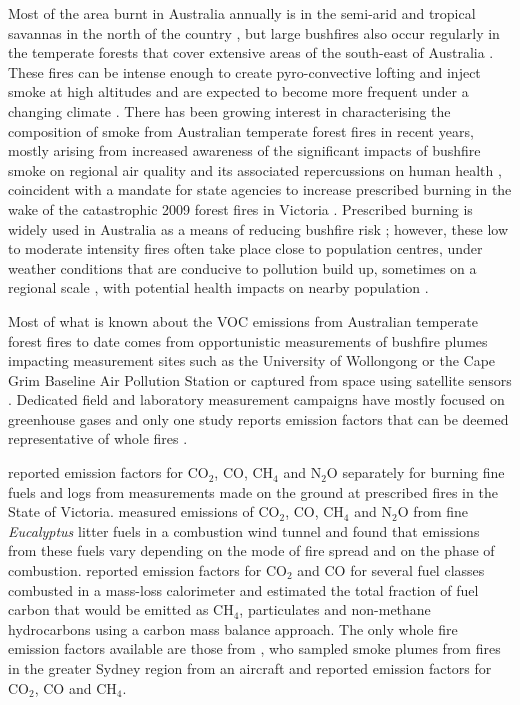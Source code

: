 \documentclass[acp, manuscript]{copernicus}
\begin{document}
Most of the area burnt in Australia annually is in the semi-arid and tropical savannas in the north of the country \citep{Russell-Smith2007}, but large bushfires also occur regularly in the temperate forests that cover extensive areas of the south-east of Australia \citep{Cai2009}. These fires can be intense enough to create pyro-convective lofting and inject smoke at high altitudes \citep{Fromm2006,Dirksen2009,Guan2010} and are expected to become more frequent under a changing climate \citep{Bradstock2009,Cai2009,Keywood2013,King2013}. There has been growing interest in characterising the composition of smoke from Australian temperate forest fires in recent years, mostly arising from increased awareness of the significant impacts of bushfire smoke on regional air quality \citep{Reisen2011,Reisen2013,Price2012,Keywood2015,Rea2016} and its associated repercussions on human health \citep{Reisen2006,Johnston2012,Johnston2014, Reisen2015, Reid2016}, coincident with a mandate for state agencies to increase prescribed burning in the wake of the catastrophic 2009 forest fires in Victoria \citep{Teague2010}. Prescribed burning is widely used in Australia as a means of reducing bushfire risk \citep{Boer2009}; however, these low to moderate intensity fires often take place close to population centres, under weather conditions that are conducive to pollution build up, sometimes on a regional scale \citep[e.g.,][Fig. 2]{Williamson2016}, with potential health impacts on nearby population \citep{Haikerwal2015}.

Most of what is known about the VOC emissions from Australian temperate forest fires to date comes from opportunistic measurements of bushfire plumes impacting measurement sites such as the University of Wollongong \citep{Paton-Walsh2005,Paton-Walsh2008, Rea2016} or the Cape Grim Baseline Air Pollution Station \citep{Lawson2015} or captured from space using satellite sensors \citep{Young2011,Glatthor2013}. Dedicated field and laboratory measurement campaigns have mostly focused on greenhouse gases \citep{Hurst1996,Volkova2014, Possell2015, Surawski2015} and only one study reports emission factors that can be deemed representative of whole fires \citep{Hurst1996}.    

\citet{Volkova2014} reported emission factors for CO$_2$, CO, CH$_4$ and N$_2$O separately for burning fine fuels and logs from measurements made on the ground at prescribed fires in the State of Victoria. \citet{Surawski2015} measured emissions of CO$_2$, CO, CH$_4$ and N$_2$O from fine \textit{Eucalyptus}
 litter fuels in a combustion wind tunnel and found that emissions from these fuels vary depending on the mode of fire spread and on the phase of combustion. \citet{Possell2015} reported emission factors for CO$_2$ and CO for several fuel classes combusted in a mass-loss calorimeter and estimated the total fraction of fuel carbon that would be emitted as CH$_4$, particulates and non-methane hydrocarbons using a carbon mass balance approach. The only whole fire emission factors available are those from \citet{Hurst1996}, who sampled smoke plumes from fires in the greater Sydney region from an aircraft and reported emission factors for CO$_2$, CO and CH$_4$. 
\end{document}
